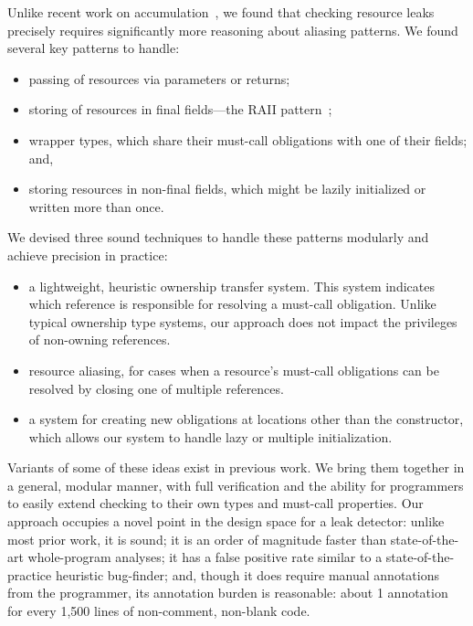 Unlike recent work on accumulation~\cite{KelloggRSSE2020}, we found
that checking resource leaks precisely requires significantly more
reasoning about aliasing patterns.  We found several key patterns to
handle:
\begin{itemize}
\item passing of resources via parameters or returns;
\item storing of resources in final fields---the RAII
pattern~\cite{raii};
\item wrapper types, which share their must-call obligations with one of their fields; and,
\item storing resources in non-final fields, which might be lazily initialized or
  written more than once.
\end{itemize}
We devised three sound techniques to handle these patterns modularly
and achieve precision in practice:
\begin{itemize}
\item a lightweight, heuristic ownership transfer system. This system
  indicates which reference is responsible for resolving a must-call
  obligation. Unlike typical ownership type systems, our approach does
  not impact the privileges of non-owning references.
\item resource aliasing, for cases
  when
  a resource's must-call obligations
  can be resolved by closing one of multiple references.
\item a system for creating new obligations at locations other than the
  constructor, which allows our system to handle lazy or multiple
  initialization.
\end{itemize}
Variants of some of these ideas exist in previous work.  We bring
them together in a general, modular manner, with full verification and
the ability for programmers to easily extend checking to their own
types and must-call properties.
%
Our approach occupies a novel point in the design space for a leak detector:
unlike most prior work, it is sound; it is an order of magnitude faster than
state-of-the-art whole-program analyses; it has a false positive rate similar
to a state-of-the-practice heuristic bug-finder; and, though it does require manual
annotations from the programmer, its annotation burden is reasonable: about
1 annotation for every 1,500 lines of non-comment, non-blank code. 

